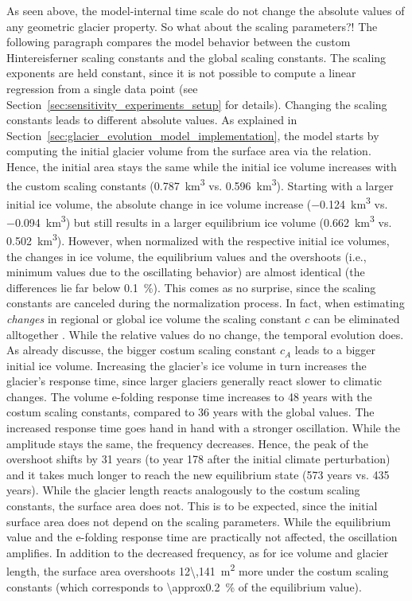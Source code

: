     As seen above, the model-internal time scale do not change the absolute values of any geometric glacier property. So what about the scaling parameters?! The following paragraph compares the model behavior between the custom Hintereisferner scaling constants and the global scaling constants. The scaling exponents are held constant, since it is not possible to compute a linear regression from a single data point (see Section~\ref{sec:sensitivity_experiments_setup} for details). %
    Changing the scaling constants leads to different absolute values. As explained in Section~\ref{sec:glacier_evolution_model_implementation}, the \vas{} model starts by computing the initial glacier volume from the surface area via the \vas{} relation. Hence, the initial area stays the same while the initial ice volume increases with the custom scaling constants (\SI{0.787}{\cubic\kilo\meter} vs. \SI{0.596}{\cubic\kilo\meter}). Starting with a larger initial ice volume, the absolute change in ice volume increase (\SI{-0.124}{\cubic\kilo\meter} vs. \SI{-0.094}{\cubic\kilo\meter}) but still results in a larger equilibrium ice volume (\SI{0.662}{\cubic\kilo\meter} vs. \SI{0.502}{\cubic\kilo\meter}). However, when normalized with the respective initial ice volumes, the changes in ice volume, the equilibrium values and the overshoots (i.e., minimum values due to the oscillating behavior) are almost identical (the differences lie far below \SI{0.1}{\percent}). This comes as no surprise, since the scaling constants are canceled during the normalization process. In fact, when estimating \emph{changes} in regional or global ice volume the scaling constant $c$ can be eliminated alltogether \citep[][Section 8.5]{Bahr2015}. While the relative values do no change, the temporal evolution does. As already discusse, the bigger costum scaling constant $c_A$ leads to a bigger initial ice volume. Increasing the glacier's ice volume in turn increases the glacier's response time, since larger glaciers generally react slower to climatic changes. The volume e-folding response time increases to 48 years with the costum scaling constants, compared to 36 years with the global values. The increased response time goes hand in hand with a stronger oscillation. While the amplitude stays the same, the frequency decreases. Hence, the peak of the overshoot shifts by 31 years (to year 178 after the initial climate perturbation) and it takes much longer to reach the new equilibrium state (573 years vs. 435 years).
    While the glacier length reacts analogously to the costum scaling constants, the surface area does not. This is to be expected, since the initial surface area does not depend on the scaling parameters. While the equilibrium value and the e-folding response time are practically not affected, the oscillation amplifies. In addition to the decreased frequency, as for ice volume and glacier length, the surface area overshoots \SI{12\,141}{\square\meter} more under the costum scaling constants (which corresponds to \SI{\approx0.2}{\percent} of the equilibrium value).
    
